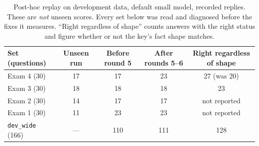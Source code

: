 \begin{table}[H]
\centering\small
\caption{Post-hoc replay on development data, default small model, recorded replies. These are \emph{not} unseen scores. Every set below was read and diagnosed before the fixes it measures. ``Right regardless of shape'' counts answers with the right status and figure whether or not the key's fact shape matches.}
\label{tab:exam-posthoc}
\begin{tabular}{lcccc}
\toprule
Set (questions) & Unseen run & Before round 5 & After rounds 5--6 & Right regardless of shape\\\midrule
Exam 4 (30) & 17 & 17 & 23 & 27 (was 20)\\ %
Exam 3 (30) & 18 & 18 & 18 & 23\\ %
Exam 2 (30) & 14 & 17 & 17 & not reported\\ %
Exam 1 (30) & 11 & 23 & 23 & not reported\\ %
\texttt{dev\_wide} (166) & --- & 110 & 111 & 128\\ %
\bottomrule
\end{tabular}
\end{table}

